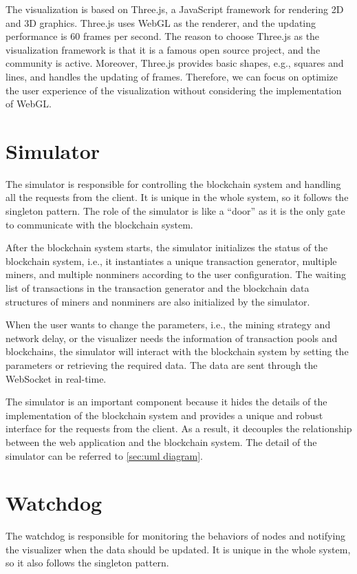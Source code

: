 The visualization is based on Three.js, a JavaScript framework for rendering 2D and 3D graphics. Three.js uses WebGL as the renderer, and the updating performance is 60 frames per second. The reason to choose Three.js as the visualization framework is that it is a famous open source project, and the community is active. Moreover, Three.js provides basic shapes, e.g., squares and lines, and handles the updating of frames. Therefore, we can focus on optimize the user experience of the visualization without considering the implementation of WebGL.

\section{Simulator}

The simulator is responsible for controlling the blockchain system and handling all the requests from the client. It is unique in the whole system, so it follows the singleton pattern. The role of the simulator is like a ``door'' as it is the only gate to communicate with the blockchain system.

After the blockchain system starts, the simulator initializes the status of the blockchain system, i.e., it instantiates a unique transaction generator, multiple miners, and multiple nonminers according to the user configuration. The waiting list of transactions in the transaction generator and the blockchain data structures of miners and nonminers are also initialized by the simulator. 

When the user wants to change the parameters, i.e., the mining strategy and network delay, or the visualizer needs the information of transaction pools and blockchains, the simulator will interact with the blockchain system by setting the parameters or retrieving the required data. The data are sent through the WebSocket in real-time.

The simulator is an important component because it hides the details of the implementation of the blockchain system and provides a unique and robust interface for the requests from the client. As a result, it decouples the relationship between the web application and the blockchain system. The detail of the simulator can be referred to \ref{sec:uml diagram}.

\section{Watchdog}

The watchdog is responsible for monitoring the behaviors of nodes and notifying the visualizer when the data should be updated. It is unique in the whole system, so it also follows the singleton pattern.

